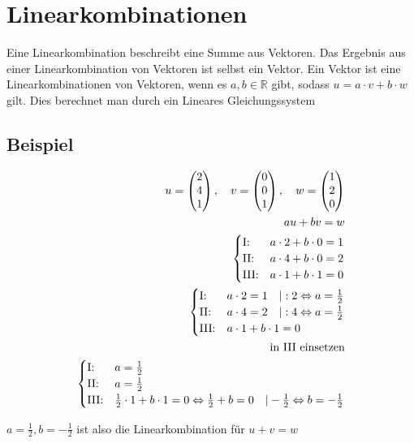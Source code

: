 \chapter{Linearkombinationen}

Eine Linearkombination beschreibt eine Summe aus Vektoren. Das Ergebnis aus einer Linearkombination von Vektoren ist selbst ein Vektor. Ein Vektor ist eine Linearkombinationen von Vektoren, wenn es $a, b \in \mathbb{R}$ gibt, sodass $u = a \cdot v + b \cdot w$ gilt. Dies berechnet man durch ein Lineares Gleichungssystem

\section{Beispiel}

\begin{align*}
    u = \begin{pmatrix}
        2 \\ 4 \\ 1
    \end{pmatrix}, \quad v = \begin{pmatrix}
        0 \\ 0 \\ 1
    \end{pmatrix}, \quad w = \begin{pmatrix}
        1 \\ 2 \\ 0
    \end{pmatrix} \\
    au + bv = w \\
    \begin{cases}
        \text{I:\@} & a \cdot 2 + b \cdot 0 = 1 \\
        \text{II:\@} & a \cdot 4 + b \cdot 0 = 2 \\
        \text{III:\@} & a \cdot 1 + b \cdot 1 = 0
    \end{cases} \\
    \begin{cases}
        \text{I:\@} & a \cdot 2 = 1 \quad | : 2 \Leftrightarrow a = \frac{1}{2}\\
        \text{II:\@} & a \cdot 4 = 2 \quad | : 4 \Leftrightarrow a = \frac{1}{2}\\
        \text{III:\@} & a \cdot 1 + b \cdot 1 = 0
    \end{cases} \\
    \text{in III einsetzen} \\
    \begin{cases}
        \text{I:\@} & a = \frac{1}{2}\\
        \text{II:\@} & a = \frac{1}{2}\\
        \text{III:\@} & \frac{1}{2} \cdot 1 + b \cdot 1 = 0 \Leftrightarrow \frac{1}{2} + b = 0 \quad |- \frac{1}{2} \Leftrightarrow b = -\frac{1}{2}
    \end{cases} \\
\end{align*}

$a = \frac{1}{2}, b = -\frac{1}{2}$ ist also die Linearkombination für $u + v = w$